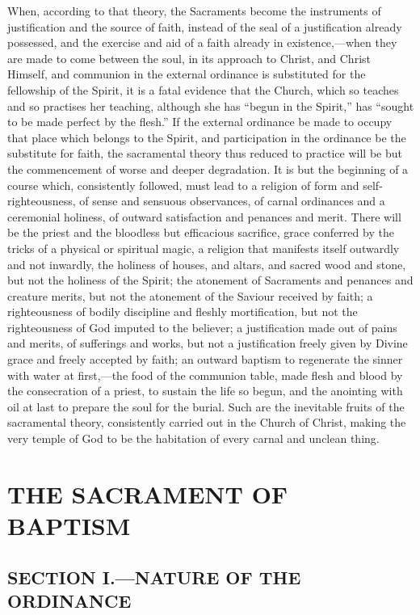 \documentclass[]{book}
\begin{document}
When, according to that theory, the Sacraments become the instruments of justification and the source of faith, instead of the seal of a justification already possessed, and the exercise and aid of a faith already in existence,---when they are made to come between the soul, in its approach to Christ, and Christ Himself, and communion in the external ordinance is substituted for the fellowship of the Spirit, it is a fatal evidence that the Church, which so teaches and so practises her teaching, although she has ``begun in the Spirit,'' has ``sought to be made perfect by the flesh.'' If the external ordinance be made to occupy that place which belongs to the Spirit, and participation in the ordinance be the substitute for faith, the sacramental theory thus reduced to practice will be but the commencement of worse and deeper degradation. It is but the beginning of a course which, consistently followed, must lead to a religion of form and self-righteousness, of sense and sensuous observances, of carnal ordinances and a ceremonial holiness, of outward satisfaction and penances and merit. There will be the priest and the bloodless but efficacious sacrifice, grace conferred by the tricks of a physical or spiritual magic, a religion that manifests itself outwardly and not inwardly, the holiness of houses, and altars, and sacred wood and stone, but not the holiness of the Spirit; the atonement of Sacraments and penances and creature merits, but not the atonement of the Saviour received by faith; a righteousness of bodily discipline and fleshly mortification, but not the righteousness of God imputed to the believer; a justification made out of pains and merits, of sufferings and works, but not a justification freely given by Divine grace and freely accepted by faith; an outward baptism to regenerate the sinner with water at first,---the food of the communion table, made flesh and blood by the consecration of a priest, to sustain the life so begun, and the anointing with oil at last to prepare the soul for the burial. Such are the inevitable fruits of the sacramental theory, consistently carried out in the Church of Christ, making the very temple of God to be the habitation of every carnal and unclean thing.

\hypertarget{the-sacrament-of-baptism}{%
\chapter{THE SACRAMENT OF BAPTISM}\label{the-sacrament-of-baptism}}

\hypertarget{section-i.nature-of-the-ordinance}{%
\section{SECTION I.---NATURE OF THE ORDINANCE}\label{section-i.nature-of-the-ordinance}}
\end{document}
